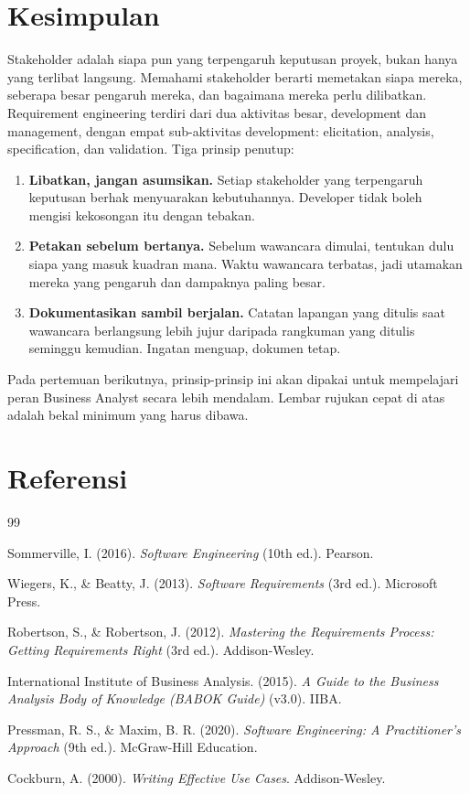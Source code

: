 \documentclass[11pt,a4paper]{article}
\begin{document}
\section{Kesimpulan}

Stakeholder adalah siapa pun yang terpengaruh keputusan proyek, bukan hanya yang terlibat langsung. Memahami stakeholder berarti memetakan siapa mereka, seberapa besar pengaruh mereka, dan bagaimana mereka perlu dilibatkan. Requirement engineering terdiri dari dua aktivitas besar, development dan management, dengan empat sub-aktivitas development: elicitation, analysis, specification, dan validation. Tiga prinsip penutup:

\begin{enumerate}
	\item \textbf{Libatkan, jangan asumsikan.} Setiap stakeholder yang terpengaruh keputusan berhak menyuarakan kebutuhannya. Developer tidak boleh mengisi kekosongan itu dengan tebakan.
	\item \textbf{Petakan sebelum bertanya.} Sebelum wawancara dimulai, tentukan dulu siapa yang masuk kuadran mana. Waktu wawancara terbatas, jadi utamakan mereka yang pengaruh dan dampaknya paling besar.
	\item \textbf{Dokumentasikan sambil berjalan.} Catatan lapangan yang ditulis saat wawancara berlangsung lebih jujur daripada rangkuman yang ditulis seminggu kemudian. Ingatan menguap, dokumen tetap.
\end{enumerate}

Pada pertemuan berikutnya, prinsip-prinsip ini akan dipakai untuk mempelajari peran Business Analyst secara lebih mendalam. Lembar rujukan cepat di atas adalah bekal minimum yang harus dibawa.

\newpage
\section*{Referensi}

\begin{thebibliography}{99}

	Sommerville, I. (2016).
	\textit{Software Engineering} (10th ed.).
	Pearson.

	Wiegers, K., \& Beatty, J. (2013).
	\textit{Software Requirements} (3rd ed.).
	Microsoft Press.

	Robertson, S., \& Robertson, J. (2012).
	\textit{Mastering the Requirements Process: Getting Requirements Right} (3rd ed.).
	Addison-Wesley.

	International Institute of Business Analysis. (2015).
	\textit{A Guide to the Business Analysis Body of Knowledge (BABOK Guide)} (v3.0).
	IIBA.

	Pressman, R. S., \& Maxim, B. R. (2020).
	\textit{Software Engineering: A Practitioner's Approach} (9th ed.).
	McGraw-Hill Education.

	Cockburn, A. (2000).
	\textit{Writing Effective Use Cases}.
	Addison-Wesley.

\end{thebibliography}
\end{document}
